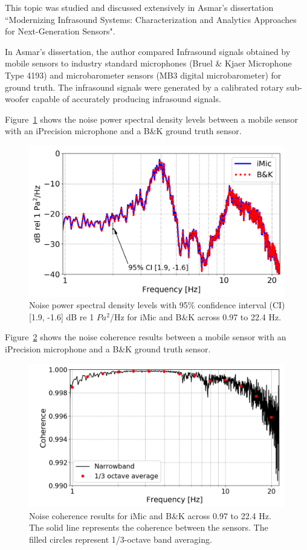 This topic was studied and discussed extensively in Asmar's dissertation ``Modernizing Infrasound Systems: Characterization and Analytics Approaches for Next-Generation Sensors"\cite{asmar19}.

In Asmar's dissertation, the author compared Infrasound signals obtained by mobile sensors to industry standard microphones (Bruel \& Kjaer Microphone Type 4193) and microbarometer sensors (MB3 digital microbarometer) for ground truth. The infrasound signals were generated by a calibrated rotary sub-woofer capable of accurately producing infrasound signals.

Figure~\ref{fig:asmar_1} shows the noise power spectral density levels between a mobile sensor with an iPrecision microphone and a B\&K ground truth sensor.

\begin{figure}[H]
    \centering
    \includegraphics[width=\linewidth]{figures/asmar_1.png}
    \caption{Noise power spectral density levels with 95\% confidence interval (CI) [1.9, -1.6] dB re 1 $Pa^2$/Hz for iMic and B\&K across 0.97 to 22.4 Hz.}
    \label{fig:asmar_1}
\end{figure}

Figure~\ref{fig:asmar_2} shows the noise coherence results between a mobile sensor with an iPrecision microphone and a B\&K ground truth sensor.

\begin{figure}[H]
    \centering
    \includegraphics[width=\linewidth]{figures/asmar_2.png}
    \caption{Noise coherence results for iMic and B\&K across 0.97 to 22.4 Hz. The solid line represents the coherence between the sensors. The filled circles represent 1/3-octave band averaging.}
    \label{fig:asmar_2}
\end{figure}

